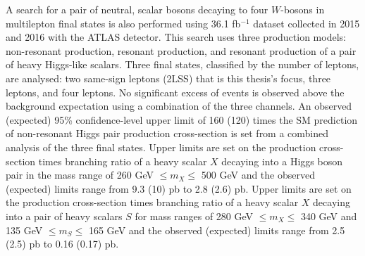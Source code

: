 A search for a pair of neutral, scalar bosons decaying to four $W$-bosons in multilepton final states is also performed using 36.1 fb$^{-1}$ dataset collected in 2015 and 2016 with the ATLAS detector. This search uses three production models: non-resonant production, resonant production, and resonant production of a pair of heavy Higgs-like scalars. Three final states, classified by the number of leptons, are analysed: two same-sign leptons (2LSS) that is this thesis's focus, three leptons, and four leptons. No significant excess of events is observed above the background expectation using a combination of the three channels. An observed (expected) 95\% confidence-level upper limit of 160 (120) times the SM prediction of non-resonant Higgs pair production cross-section is set from a combined analysis of the three final states. Upper limits are set on the production cross-section times branching ratio of a heavy scalar $X$
 decaying into a Higgs boson pair in the mass range of 260 GeV $\leq m_X\leq$ 500 GeV and the observed (expected) limits range from 9.3 (10) pb to 2.8 (2.6) pb. Upper limits are set on the production cross-section times branching ratio of a heavy scalar $X$ decaying into a pair of heavy scalars $S$ for mass ranges of 280 GeV $\leq m_X\leq$ 340 GeV and 135 GeV $\leq m_S\leq$ 165 GeV and the observed (expected) limits range from 2.5 (2.5) pb to 0.16 (0.17) pb.

